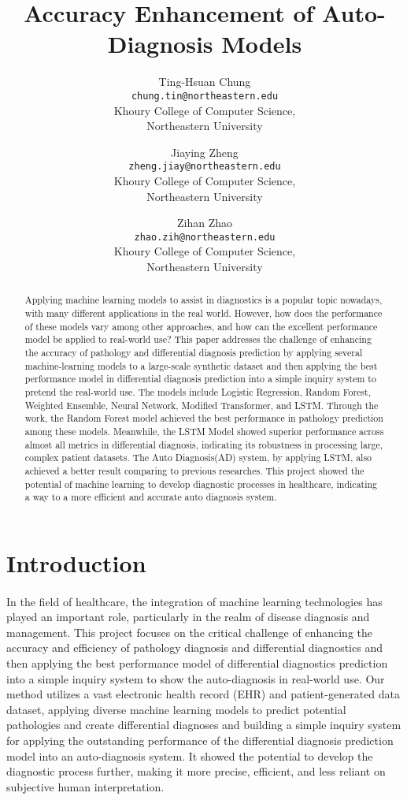\documentclass{article}
\title{Accuracy Enhancement of Auto-Diagnosis Models}
\author{\small
Ting-Hsuan Chung\\
\small\texttt{chung.tin@northeastern.edu}\\
\small Khoury College of Computer Science,\\
\small Northeastern University\\
\and
\small Jiaying Zheng\\
\small \texttt{zheng.jiay@northeastern.edu}\\
\small Khoury College of Computer Science,\\
\small Northeastern University\\
\and
\small Zihan Zhao\\
\small \texttt{zhao.zih@northeastern.edu}\\
\small Khoury College of Computer Science,\\
\small Northeastern University\\
}
\date{}
\begin{document}
\maketitle

\begin{abstract}
Applying machine learning models to assist in diagnostics is a popular topic nowadays, with many different applications in the real world. However, how does the performance of these models vary among other approaches, and how can the excellent performance model be applied to real-world use? This paper addresses the challenge of enhancing the accuracy of pathology and differential diagnosis prediction by applying several machine-learning models to a large-scale synthetic dataset and then applying the best performance model in differential diagnosis prediction into a simple inquiry system to pretend the real-world use. The models include Logistic Regression, Random Forest, Weighted Ensemble, Neural Network, Modified Transformer, and LSTM. Through the work, the Random Forest model achieved the best performance in pathology prediction among these models. Meanwhile, the LSTM Model showed superior performance across almost all metrics in differential diagnosis, indicating its robustness in processing large, complex patient datasets. The Auto Diagnosis(AD) system, by applying LSTM, also achieved a better result comparing to previous researches. This project showed the potential of machine learning to develop diagnostic processes in healthcare, indicating a way to a more efficient and accurate auto diagnosis system.
\end{abstract}



\section{Introduction}
\paragraph{ }
In the field of healthcare, the integration of machine learning technologies has played an important role\parencite{Haug_2023}\parencite{Miotto_2018}, particularly in the realm of disease diagnosis and management. This project focuses on the critical challenge of enhancing the accuracy and efficiency of pathology diagnosis and differential diagnostics and then applying the best performance model of differential diagnostics prediction into a simple inquiry system to show the auto-diagnosis in real-world use. Our method utilizes a vast electronic health record (EHR) and patient-generated data dataset, applying diverse machine learning models to predict potential pathologies and create differential diagnoses and building a simple inquiry system for applying the outstanding performance of the differential diagnosis prediction model into an auto-diagnosis system. It showed the potential to develop the diagnostic process further, making it more precise, efficient, and less reliant on subjective human interpretation.
\end{document}
